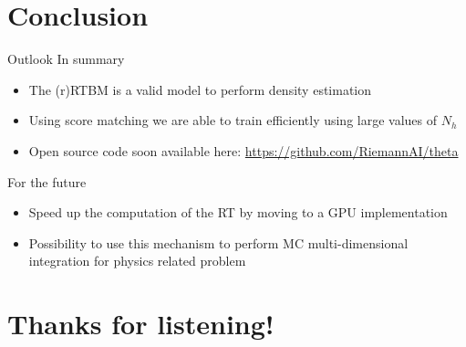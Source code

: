 \documentclass[10pt]{beamer}
\begin{document}
\section{Conclusion}

\begin{frame}{Outlook}
    In summary
    \begin{itemize}
        \item The (r)RTBM is a valid model to perform density estimation
        \item Using score matching we are able to train efficiently using large values of $N_h$
        \item Open source code soon available here: \url{https://github.com/RiemannAI/theta}
    \end{itemize}
    
    For the future
    \begin{itemize}
        \item Speed up the computation of the RT by moving to a GPU implementation
        \item Possibility to use this mechanism to perform MC multi-dimensional integration for physics related problem
    \end{itemize}
\end{frame}

\section*{Thanks for listening!}


\end{document}
